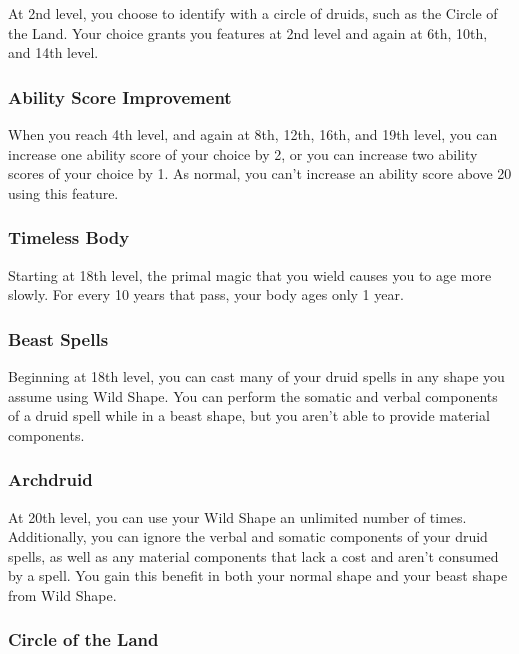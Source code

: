 \documentclass[
]{article}
\begin{document}
At 2nd level, you choose to identify with a circle of druids, such as
the Circle of the Land. Your choice grants you features at 2nd level and
again at 6th, 10th, and 14th level.

\hypertarget{ability-score-improvement}{%
\subsubsection{Ability Score
Improvement}\label{ability-score-improvement}}

When you reach 4th level, and again at 8th, 12th, 16th, and 19th level,
you can increase one ability score of your choice by 2, or you can
increase two ability scores of your choice by 1. As normal, you can't
increase an ability score above 20 using this feature.

\hypertarget{timeless-body}{%
\subsubsection{Timeless Body}\label{timeless-body}}

Starting at 18th level, the primal magic that you wield causes you to
age more slowly. For every 10 years that pass, your body ages only 1
year.

\hypertarget{beast-spells}{%
\subsubsection{Beast Spells}\label{beast-spells}}

Beginning at 18th level, you can cast many of your druid spells in any
shape you assume using Wild Shape. You can perform the somatic and
verbal components of a druid spell while in a beast shape, but you
aren't able to provide material components.

\hypertarget{archdruid}{%
\subsubsection{Archdruid}\label{archdruid}}

At 20th level, you can use your Wild Shape an unlimited number of times.
Additionally, you can ignore the verbal and somatic components of your
druid spells, as well as any material components that lack a cost and
aren't consumed by a spell. You gain this benefit in both your normal
shape and your beast shape from Wild Shape.

\hypertarget{circle-of-the-land}{%
\subsubsection{Circle of the Land}\label{circle-of-the-land}}
\end{document}
